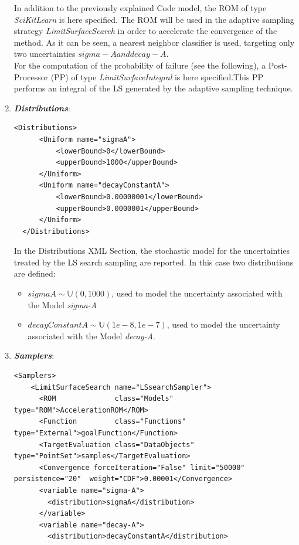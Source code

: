 \begin{enumerate}
 In addition to the previously explained Code 
 model,
 the ROM of type \textit{SciKitLearn} is here specified. The ROM will be
 used in the adaptive sampling strategy \textit{LimitSurfaceSearch} in
 order to accelerate the convergence of the method. As it can be seen,
 a nearest neighbor classifier is used, targeting only two uncertainties 
 $sigma-A and decay-A$.
 \\ For the computation of the probability of failure (see the following), a 
 Post-Processor (PP) of type \textit{LimitSurfaceIntegral} is here 
 specified.This PP performs an integral of the LS 
 generated by the adaptive sampling technique. 
   \item \textbf{\textit{Distributions}}:
\begin{lstlisting}[style=XML]
  <Distributions>
      <Uniform name="sigmaA">
          <lowerBound>0</lowerBound>
          <upperBound>1000</upperBound>
      </Uniform>
      <Uniform name="decayConstantA">
          <lowerBound>0.00000001</lowerBound>
          <upperBound>0.0000001</upperBound>
      </Uniform>
  </Distributions>
\end{lstlisting}
  In the Distributions XML Section, the stochastic model for the 
  uncertainties  treated by the LS search sampling are reported. In 
  this case two distributions are defined: 
  \begin{itemize}
    \item $sigmaA \sim \mathbb{U}(0,1000)$, used to model the uncertainty 
    associated with  the Model \textit{sigma-A}
    \item  $decayConstantA \sim \mathbb{U}(1e-8,1e-7)$,  used to 
    model the uncertainty 
    associated with  the Model \textit{decay-A}.
  \end{itemize}
   \item \textbf{\textit{Samplers}}:
\begin{lstlisting}[style=XML,morekeywords={arg,extension,pauseAtEnd,overwrite}]
  <Samplers>
    <LimitSurfaceSearch name="LSsearchSampler">
      <ROM              class="Models"      type="ROM">AccelerationROM</ROM>
      <Function         class="Functions"   type="External">goalFunction</Function>
      <TargetEvaluation class="DataObjects" type="PointSet">samples</TargetEvaluation>
      <Convergence forceIteration="False" limit="50000" persistence="20"  weight="CDF">0.00001</Convergence>
      <variable name="sigma-A">
        <distribution>sigmaA</distribution>
      </variable>
      <variable name="decay-A">
        <distribution>decayConstantA</distribution>

\end{lstlisting}
\end{enumerate}
